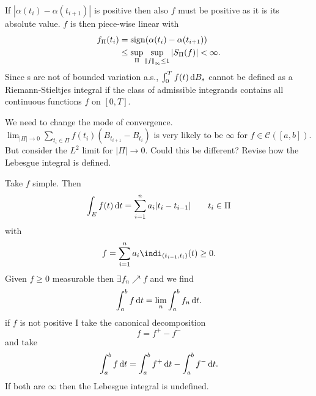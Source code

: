 \documentclass[crop=false, class=article]{standalone}
\begin{document}
\begin{fancyproof}
\begin{figure}[H]
		\label{fig:screenshot001}
	\end{figure}
	If $|\alpha(t_{i})-\alpha(t_{i+1})|$ is positive then also $f$ must be positive as it is its absolute value. $f$ is then piece-wise linear with 
	\begin{align*}
		f_{\Pi}(t_{i}) & =\mathrm{sign}(\alpha(t_{i})-\alpha(t_{i+1}))\\
		 & \leq\sup_{\Pi}\sup_{\left|\negthinspace\left|f\right|\negthinspace\right|_{\infty}\leq1}|S_{\Pi}(f)|<\infty.
	\end{align*}
	Since \brm s are not of bounded variation a.s., $\int_{0}^{T}f(t)\mathop{}\!\mathrm{d} B_{s}$ cannot be defined as a Riemann-Stieltjes integral if the class of admissible integrands contains all continuous functions $f$ on $[0,T]$.
\end{fancyproof}
We need to change the mode of convergence. $\lim_{|\Pi|\to 0}\sum_{t_i\in\Pi}f(t_{i})(B_{t_{i+1}}-B_{t_{i}})$ is very likely to be $\infty$ for $f\in\mathcal{C}([a,b])$. But consider the $L^{2}$ limit for $|\Pi|\to0$. Could this be different? Revise how the Lebesgue integral is defined.
\begin{revise}
	Take $f$ simple. Then
	\begin{equation*}
		\int_{E}f(t)\mathop{}\!\mathrm{d} t=\sum_{i=1}^{n}a_{i}|t_{i}-t_{i-1}| \qquad t_{i}\in\Pi
	\end{equation*}
	with
	\begin{equation*}
		f=\sum_{i=1}^{n}a_{i}\indi_{(t_{i-1},t_{i})}(t)\geq0.
	\end{equation*}
	Given $f\geq0$ measurable then $\exists f_{n}\nearrow f$ and we find
	\begin{equation*}
		\int_{a}^{b}f\mathop{}\!\mathrm{d} t=\lim_{n}\int_{a}^{b}f_{n}\mathop{}\!\mathrm{d} t.
	\end{equation*}
	if $f$ is not positive I take the canonical decomposition
	\begin{equation*}
		f=f^{+}-f^{-}
	\end{equation*}
	and take
	\begin{equation*}
			\int_{a}^{b}f\mathop{}\!\mathrm{d} t=	\int_{a}^{b}f^{+}\mathop{}\!\mathrm{d} t-	\int_{a}^{b}f^{-}\mathop{}\!\mathrm{d} t.
	\end{equation*}
	If both are $\infty$ then the Lebesgue integral is undefined.
\end{revise}
\end{document}
